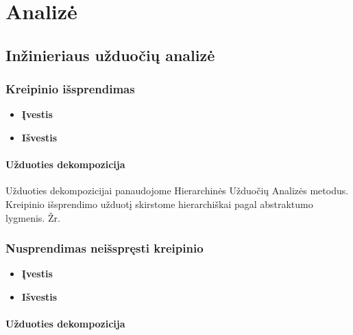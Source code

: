 \section{Analizė}

\subsection{Inžinieriaus užduočių analizė}
	
	\subsubsection{Kreipinio išsprendimas}
	
		\begin{itemize}
			\item \textbf{Įvestis}
			\item \textbf{Išvestis} 
		\end{itemize}
		
		
	\paragraph{Užduoties dekompozicija}
	
	
	Užduoties dekompozicijai panaudojome Hierarchinės Užduočių Analizės metodus.
	Kreipinio išsprendimo užduotį skirstome hierarchiškai pagal abstraktumo lygmenis. 
	Žr. 
	
 		
	\subsubsection{Nusprendimas neišspręsti kreipinio}
	
		\begin{itemize}
			\item \textbf{Įvestis}
			\item \textbf{Išvestis} 
		\end{itemize}
		
		
	\paragraph{Užduoties dekompozicija} 
	
	
